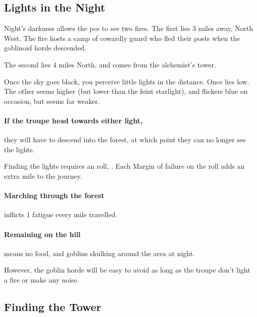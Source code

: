 \begin{multicols}{2}

\subsection{Lights in the Night}

Night's darkness allows the \glspl{pc} to see two fires.
The first lies 3 miles away, North West.
The fire hosts a camp of cowardly \gls{guard} who fled their posts when the goblinoid horde descended.

The second lies 4 miles North, and comes from the alchemist's tower.

\begin{boxtext}
  Once the sky goes black, you perceive little lights in the distance.
  Once lies low.
  The other seems higher (but lower than the feint starlight), and flickers blue on occasion, but seems far weaker.
\end{boxtext}

\paragraph{If the troupe head towards either light,}
they will have to descend into the forest, at which point they can no longer see the lights.

Finding the lights requires an  roll, \tn[9].
Each Margin of failure on the roll adds an extra mile to the journey.

\paragraph{Marching through the forest}
inflicts 1 \gls{fatigue} every mile travelled.%

\paragraph{Remaining on the hill}
means no food, and goblins skulking around the area at night.

However, the goblin horde will be easy to avoid as long as the troupe don't light a fire or make any noise.


\subsection{Finding the Tower}

\begin{boxtext}


\end{boxtext}
\end{multicols}
